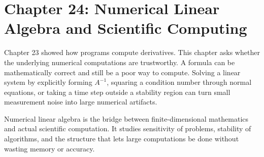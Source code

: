 \section{Chapter 24: Numerical Linear Algebra and Scientific Computing}
\label{ch:numerical-linear-algebra-scientific-computing}

Chapter 23 showed how programs compute derivatives. This chapter asks whether the underlying numerical computations are trustworthy. A formula can be mathematically correct and still be a poor way to compute. Solving a linear system by explicitly forming \(A^{-1}\), squaring a condition number through normal equations, or taking a time step outside a stability region can turn small measurement noise into large numerical artifacts.

Numerical linear algebra is the bridge between finite-dimensional mathematics and actual scientific computation. It studies sensitivity of problems, stability of algorithms, and the structure that lets large computations be done without wasting memory or accuracy.

